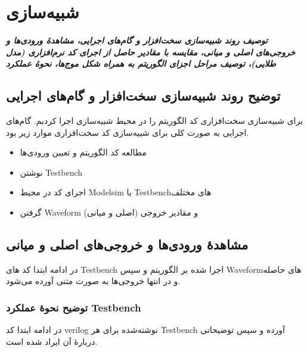 \chapter{شبیه‌سازی}
\noindent
\textbf{
\textit{
توصیف روند شبیه‌سازی سخت‌افزار و گام‌های اجرایی، مشاهدهٔ ورودی‌ها و خروجی‌های اصلی و میانی، مقایسه با مقادیر حاصل از اجرای کد نرم‌افزاری (مدل طلایی)، توصیف مراحل اجزای الگوریتم به همراه شکل موج‌ها، نحوهٔ عملکرد 
}
}
\pagebreak

\section{توضیح روند شبیه‌سازی سخت‌افزار و گام‌های اجرایی}
برای شبیه‌سازی سخت‌افزاری کد 
الگوریتم 
را در محیط شبیه‌سازی 
اجرا کردیم. گام‌های اجرایی به صورت کلی برای شبیه‌سازی کد سخت‌افزاری موارد زیر بود. 
\begin{itemize}
\item
مطالعه کد الگوریتم و تعیین ورودی‌ها
\item
نوشتن Testbench
\item
اجرای کد در محیط Modelsim با Testbenchهای مختلف
\item
گرفتن Waveform و مقادیر خروجی (اصلی و میانی)
\end{itemize}
\section{مشاهدهٔ ورودی‌ها و خروجی‌های اصلی و میانی}
در ادامه ابتدا کد های Testbench اجرا شده بر الگوریتم و سپس Waveformهای حاصله و در انتها خروجی‌ها به صورت متنی آورده می‌شود.

\subsection{توضیح نحوهٔ عملکرد Testbench}
در ادامه ابتدا کد verilog نوشته‌شده برای هر Testbench آورده  و سپس توضیحاتی دربارهٔ آن ایراد شده است. 

 \subsubsection{}

